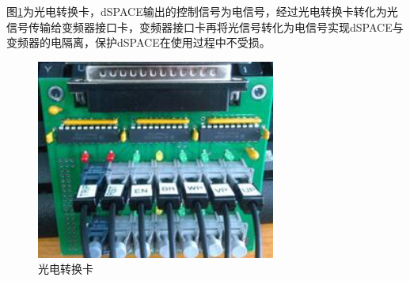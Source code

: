 图\ref{fig:optical}为光电转换卡，dSPACE输出的控制信号为电信号，经过光电转换卡转化为光信号传输给变频器接口卡，变频器接口卡再将光信号转化为电信号实现dSPACE与变频器的电隔离，保护dSPACE在使用过程中不受损。
\begin{figure}[H]
	\centering
	\includegraphics[width=0.7\textwidth]{figs/optical.jpg}
	\caption{光电转换卡}
	\label{fig:optical}
\end{figure}

